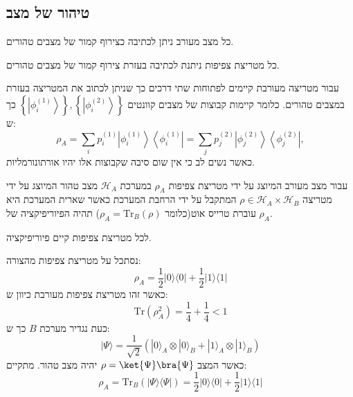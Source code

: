 \documentclass{tstextbook}
\begin{document}
\subsection{טיהור של מצב}

\begin{reminder}
כל מצב מעורב ניתן לכתיבה כצירוף קמור של מצבים טהורים.

\end{reminder}
\begin{proposition}
כל מטריצת צפיפות ניתנת לכתיבה בעזרת צירוף קמור של מצבים טהורים.

\end{proposition}
\begin{proposition}
עבור מטריצה מעורבת קיימים לפתוחות שתי דרכים כך שניתן לכתוב את המטריצה בעזרת במצבים טהורים. כלומר קיימות קבוצות של מצבים קוונטים \(\left\{\left|\phi_{i}^{(1)}\right\rangle\right\},\left\{\left|\phi_{i}^{(2)}\right\rangle\right\}\) כך ש:
$$\rho_{A}=\sum_{i}p_{i}^{(1)}\left|\phi_{i}^{(1)}\right\rangle\left\langle\phi_{i}^{(1)}\right|=\sum_{j}p_{j}^{(2)}\left|\phi_{j}^{(2)}\right\rangle\left\langle\phi_{j}^{(2)}\right|,$$
כאשר נשים לב כי אין שום סיבה שקבוצות אלו יהיו אורתונורמליות.

\end{proposition}
\begin{definition}
עבור מצב מעורב המיוצג על ידי מטריצת צפיפות \(\rho_{A}\) במערכת \(\mathcal{H}_{A}\) מצב טהור המיוצג על ידי מטריצה \(\rho \in \mathcal{H}_{A}\times \mathcal{H}_{B}\) המתקבל על ידי הרחבת המערכת כאשר שארית המערכת היא עוברת טרייס אוט(כלומר \(\rho_{A}=\mathrm{Tr}_{B}\left( \rho \right)\)) תהיה הפיוריפיקציה של \(\rho_{A}\).

\end{definition}
\begin{theorem}
לכל מטריצת צפיפות קיים פיוריפיקציה.

\end{theorem}
\begin{example}
נסתכל על מטריצת צפיפות מהצורה:
$$\rho_{A}=\frac{1}{2}|0\rangle\langle0|+\frac{1}{2}|1\rangle\langle 1|$$
כאשר זהו מטריצת צפיפות מעורבת כיוון ש:
$$\mathrm{Tr}\left( \rho_{A}^{2} \right) = \frac{1}{4}+\frac{1}{4}< 1$$
כעת נגדיר מערכת \(B\) כך ש:
$$|\Psi\rangle=\frac{1}{\sqrt{2}}(|0\rangle_{A}\otimes|0\rangle_{B}+|1\rangle_{A}\otimes|1\rangle_{B})$$
כאשר המצב \(\rho=\ket{\Psi}\bra{\Psi}\) יהיה מצב טהור. מתקיים:
$$\rho_{A}=\mathrm{Tr}_{B}(|\Psi\rangle\langle\Psi|)=\frac{1}{2}|0\rangle\langle0|+\frac{1}{2}|1\rangle\langle1|$$

\end{example}
\end{document}
